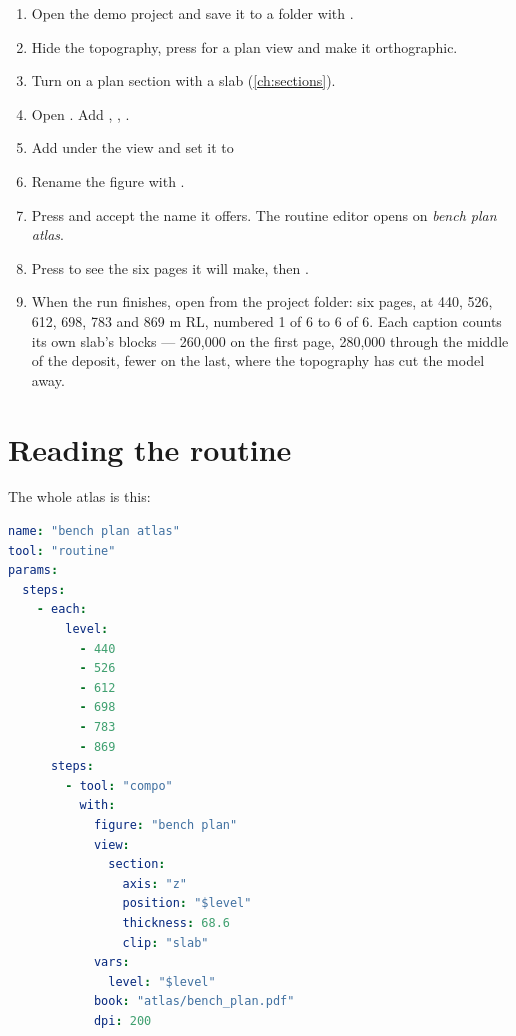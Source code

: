 \begin{tryit}
\begin{enumerate}
\item Open the demo project and save it to a folder with .
\item Hide the topography, press  for a plan view and make it orthographic.
\item Turn on a plan section with a slab (\cref{ch:sections}).
\item Open . Add , , .
\item Add  under the view and set it to\\
\item Rename the figure  with .
\item Press  and accept the name it offers. The routine editor opens on \emph{bench plan atlas}.
\item Press  to see the six pages it will make, then .
\item When the run finishes, open  from the project folder: six pages, at 440, 526, 612, 698, 783 and 869 m RL, numbered 1 of 6 to 6 of 6. Each caption counts its own slab's blocks — 260,000 on the first page, 280,000 through the middle of the deposit, fewer on the last, where the topography has cut the model away.
\end{enumerate}
\end{tryit}


\section{Reading the routine}\label{sec:atlas-yaml}

The whole atlas is this:

\begin{lstlisting}[language=yaml]
name: "bench plan atlas"
tool: "routine"
params:
  steps:
    - each:
        level:
          - 440
          - 526
          - 612
          - 698
          - 783
          - 869
      steps:
        - tool: "compo"
          with:
            figure: "bench plan"
            view:
              section:
                axis: "z"
                position: "$level"
                thickness: 68.6
                clip: "slab"
            vars:
              level: "$level"
            book: "atlas/bench_plan.pdf"
            dpi: 200
\end{lstlisting}

